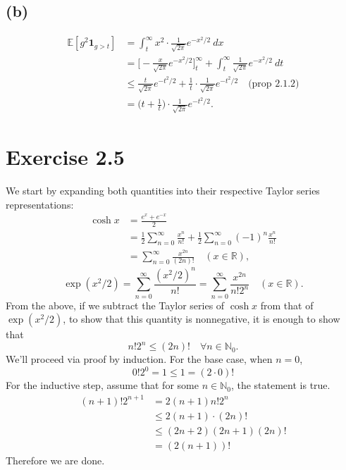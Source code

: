 \subsection*{(b)}
\begin{align*}
	\mathbb{E}[g^2 \mathbf{1}_{g > t}] 
	&= \int_{t}^{\infty} x^2 \cdot \frac{1}{\sqrt{2 \pi}} e^{-x^2 / 2} \ dx \\
	&= \biggl[ -\frac{x}{\sqrt{2 \pi}} e^{-x^2 / 2} \biggr]_t^\infty 
	+ \int_{t}^{\infty} \frac{1}{\sqrt{2 \pi}} e^{-x^2 / 2} \ dt \\
	&\leq \frac{t}{\sqrt{2 \pi}} e^{-t^2 / 2} + \frac{1}{t} \cdot 
	\frac{1}{\sqrt{2 \pi}} e^{-t^2 / 2} \quad \text{(prop 2.1.2)} \\
	&= \biggl( t + \frac{1}{t} \biggr) \cdot \frac{1}{\sqrt{2 \pi}} e^{-t^2 / 2}.
\end{align*}


\newpage
\section*{Exercise 2.5}
We start by expanding both quantities into their respective Taylor series representations: 
\begin{align*}
	\cosh{x} 
	&= \frac{e^x + e^{-x}}{2} \\
	&= \frac{1}{2}\sum_{n = 0}^{\infty} \frac{x^n}{n!} + \frac{1}{2}\sum_{n = 0}^{\infty} 
	(-1)^n \frac{x^n}{n!} \\
	&= \sum_{n = 0}^{\infty} \frac{x^{2n}}{(2n)!} \quad (x \in \mathbb{R}),
\end{align*}
\[ \exp{(x^2 / 2)} = \sum_{n = 0}^{\infty} \frac{(x^2 / 2)^n}{n!} 
= \sum_{n = 0}^{\infty} \frac{x^{2n}}{n! 2^n} \quad (x \in \mathbb{R}). \]
From the above, if we subtract the Taylor series of $\cosh{x}$ from that of $\exp{(x^2 / 2)}$, to show 
that this quantity is nonnegative, it is enough to show that 
\[ n! 2^n \leq (2n)! \quad \forall n \in \mathbb{N}_0. \]
We'll proceed via proof by induction. For the base case, when $n = 0$, 
\[ 0! 2^0 = 1 \leq 1 = (2 \cdot 0)! \]
For the inductive step, assume that for some $n \in \mathbb{N}_0$, the statement is true.
\begin{align*}
	(n + 1)! 2^{n + 1} 
	&= 2(n + 1) n! 2^n \\
	&\leq 2(n + 1) \cdot (2n)! \\
	&\leq (2n + 2)(2n + 1)(2n)! \\
	&= (2(n + 1))!
\end{align*}
Therefore we are done.


